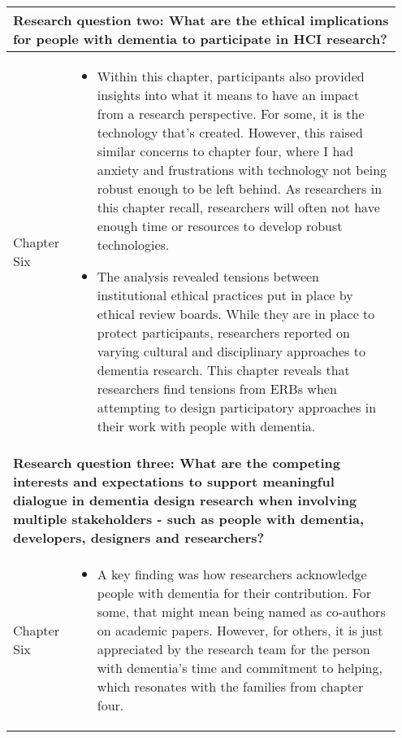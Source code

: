 \begin{table}[htp]
    \centering
    \begin{tabular}{p{0.15\linewidth} | p{0.8\linewidth}}
    \multicolumn{2}{p{0.95\linewidth}}{\textbf{Research question two: What are the ethical implications for people with dementia to participate in HCI research?}} 

    \\ \hline

    Chapter Six &
    \begin{itemize}
          \item Within this chapter, participants also provided insights into what it means to have an impact from a research perspective. For some, it is the technology that's created. However, this raised similar concerns to chapter four, where I had anxiety and frustrations with technology not being robust enough to be left behind. As researchers in this chapter recall, researchers will often not have enough time or resources to develop robust technologies.

          \item The analysis revealed tensions between institutional ethical practices put in place by ethical review boards. While they are in place to protect participants, researchers reported on varying cultural and disciplinary approaches to dementia research. This chapter reveals that researchers find tensions from ERBs when attempting to design participatory approaches in their work with people with dementia.

      \end{itemize}
       \\ \hline
      
    \multicolumn{2}{p{0.95\linewidth}}{\textbf{Research question three: What are the competing interests and expectations to support meaningful dialogue in dementia design research when involving multiple stakeholders - such as people with dementia, developers, designers and researchers?}} \\ \hline
     
    Chapter Six &
    \begin{itemize}
          \item A key finding was how researchers acknowledge people with dementia for their contribution. For some, that might mean being named as co-authors on academic papers. However, for others, it is just appreciated by the research team for the person with dementia's time and commitment to helping, which resonates with the families from chapter four.


\end{itemize}
\end{tabular}
\end{table}
